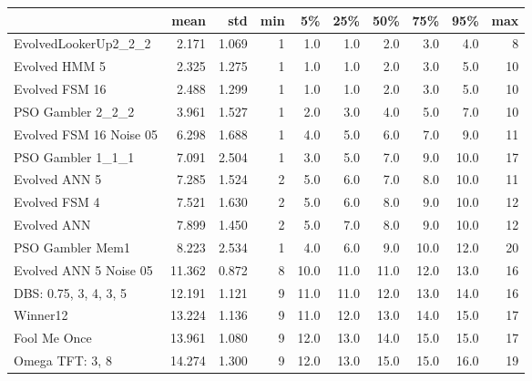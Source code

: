 \begin{tabular}{lrrrrrrrrr}
\toprule
{} &    mean &    std &  min &    5\% &   25\% &   50\% &   75\% &   95\% &  max \\
\midrule
EvolvedLookerUp2\_2\_2    &   2.171 &  1.069 &    1 &   1.0 &   1.0 &   2.0 &   3.0 &   4.0 &    8 \\
Evolved HMM 5           &   2.325 &  1.275 &    1 &   1.0 &   1.0 &   2.0 &   3.0 &   5.0 &   10 \\
Evolved FSM 16          &   2.488 &  1.299 &    1 &   1.0 &   1.0 &   2.0 &   3.0 &   5.0 &   10 \\
PSO Gambler 2\_2\_2       &   3.961 &  1.527 &    1 &   2.0 &   3.0 &   4.0 &   5.0 &   7.0 &   10 \\
Evolved FSM 16 Noise 05 &   6.298 &  1.688 &    1 &   4.0 &   5.0 &   6.0 &   7.0 &   9.0 &   11 \\
PSO Gambler 1\_1\_1       &   7.091 &  2.504 &    1 &   3.0 &   5.0 &   7.0 &   9.0 &  10.0 &   17 \\
Evolved ANN 5           &   7.285 &  1.524 &    2 &   5.0 &   6.0 &   7.0 &   8.0 &  10.0 &   11 \\
Evolved FSM 4           &   7.521 &  1.630 &    2 &   5.0 &   6.0 &   8.0 &   9.0 &  10.0 &   12 \\
Evolved ANN             &   7.899 &  1.450 &    2 &   5.0 &   7.0 &   8.0 &   9.0 &  10.0 &   12 \\
PSO Gambler Mem1        &   8.223 &  2.534 &    1 &   4.0 &   6.0 &   9.0 &  10.0 &  12.0 &   20 \\
Evolved ANN 5 Noise 05  &  11.362 &  0.872 &    8 &  10.0 &  11.0 &  11.0 &  12.0 &  13.0 &   16 \\
DBS: 0.75, 3, 4, 3, 5   &  12.191 &  1.121 &    9 &  11.0 &  11.0 &  12.0 &  13.0 &  14.0 &   16 \\
Winner12                &  13.224 &  1.136 &    9 &  11.0 &  12.0 &  13.0 &  14.0 &  15.0 &   17 \\
Fool Me Once            &  13.961 &  1.080 &    9 &  12.0 &  13.0 &  14.0 &  15.0 &  15.0 &   17 \\
Omega TFT: 3, 8         &  14.274 &  1.300 &    9 &  12.0 &  13.0 &  15.0 &  15.0 &  16.0 &   19 \\
\bottomrule
\end{tabular}
